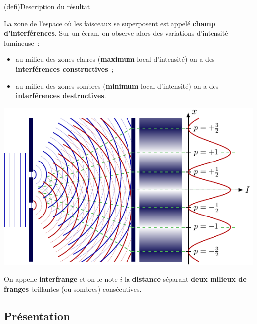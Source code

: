 \documentclass[../../main/main.tex]{subfiles}
\begin{document}

\begin{tcb}(defi){Description du résultat}
	\begin{isd}
		La zone de l'espace où les faisceaux se superposent est appelé \textbf{champ
			d'interférences}. Sur un écran, on observe alors des variations
		d'intensité lumineuse~:
		\begin{itemize}
			\item au milieu des zones claires (\textbf{maximum} local d'intensité)
			      on a des \textbf{interférences constructives}~;
			\item au milieu des zones sombres (\textbf{minimum} local d'intensité)
			      on a des \textbf{interférences destructives}.
		\end{itemize}
		\tcblower
		\begin{center}
			\includegraphics[width=\linewidth]{young_result}
		\end{center}
	\end{isd}
	On appelle \textbf{interfrange} et on le note $i$ la \textbf{distance}
	séparant \textbf{deux milieux de franges} brillantes (ou sombres)
	consécutives.
\end{tcb}

\subsection{Présentation}
\end{document}
